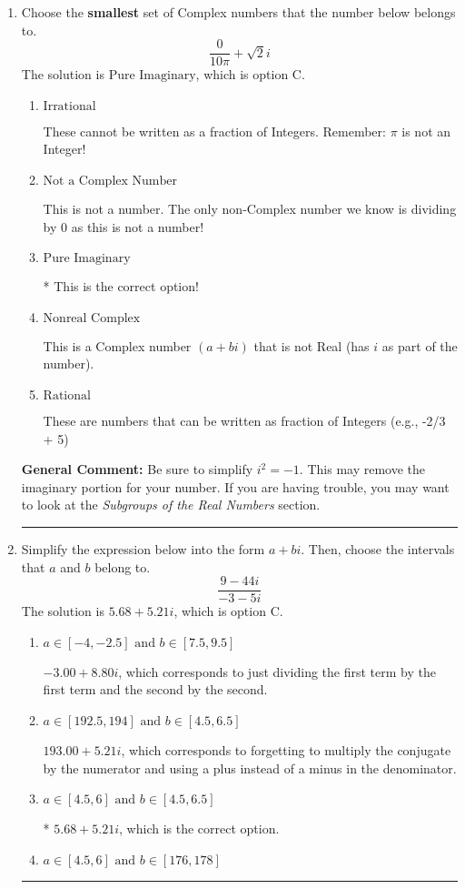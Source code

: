 \documentclass{extbook}[14pt]
\newcommand{\litem}[1]{\item #1

\rule{\textwidth}{0.4pt}}
\begin{document}
\begin{enumerate}\litem{
Choose the \textbf{smallest} set of Complex numbers that the number below belongs to.
\[ \frac{0}{10 \pi}+\sqrt{2}i \]The solution is \( \text{Pure Imaginary} \), which is option C.\begin{enumerate}[label=\Alph*.]
\item \( \text{Irrational} \)

These cannot be written as a fraction of Integers. Remember: $\pi$ is not an Integer!
\item \( \text{Not a Complex Number} \)

This is not a number. The only non-Complex number we know is dividing by 0 as this is not a number!
\item \( \text{Pure Imaginary} \)

* This is the correct option!
\item \( \text{Nonreal Complex} \)

This is a Complex number $(a+bi)$ that is not Real (has $i$ as part of the number).
\item \( \text{Rational} \)

These are numbers that can be written as fraction of Integers (e.g., -2/3 + 5)
\end{enumerate}

\textbf{General Comment:} Be sure to simplify $i^2 = -1$. This may remove the imaginary portion for your number. If you are having trouble, you may want to look at the \textit{Subgroups of the Real Numbers} section.
}
\litem{
Simplify the expression below into the form $a+bi$. Then, choose the intervals that $a$ and $b$ belong to.
\[ \frac{9 - 44 i}{-3 - 5 i} \]The solution is \( 5.68  + 5.21 i \), which is option C.\begin{enumerate}[label=\Alph*.]
\item \( a \in [-4, -2.5] \text{ and } b \in [7.5, 9.5] \)

 $-3.00  + 8.80 i$, which corresponds to just dividing the first term by the first term and the second by the second.
\item \( a \in [192.5, 194] \text{ and } b \in [4.5, 6.5] \)

 $193.00  + 5.21 i$, which corresponds to forgetting to multiply the conjugate by the numerator and using a plus instead of a minus in the denominator.
\item \( a \in [4.5, 6] \text{ and } b \in [4.5, 6.5] \)

* $5.68  + 5.21 i$, which is the correct option.
\item \( a \in [4.5, 6] \text{ and } b \in [176, 178] \)


\end{enumerate}}
\end{enumerate}
\end{document}
